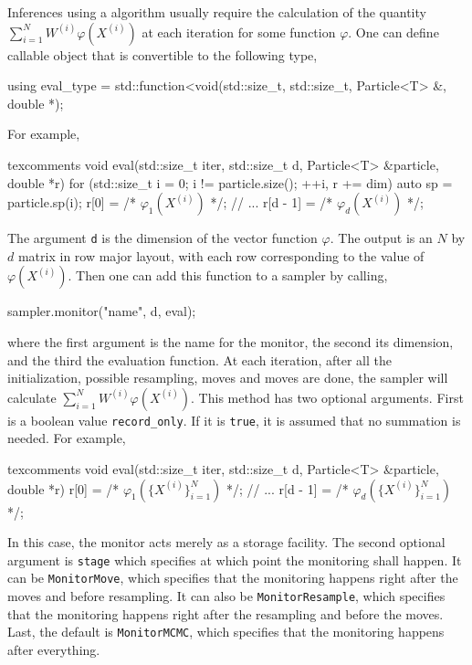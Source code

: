 Inferences using a \smc algorithm usually require the calculation of the
quantity $\sum_{i=1}^NW^{(i)}\varphi(X^{(i)})$ at each iteration for some
function $\varphi$. One can define callable object that is convertible to the
following type,
\begin{cppcode}
  using eval_type =
      std::function<void(std::size_t, std::size_t, Particle<T> &, double *);
\end{cppcode}
For example,
\begin{cppcode*}{texcomments}
  void eval(std::size_t iter, std::size_t d, Particle<T> &particle, double *r)
  {
      for (std::size_t i = 0; i != particle.size(); ++i, r += dim) {
          auto sp = particle.sp(i);
          r[0] = /* $\varphi_1(X^{(i)})$ */;
          // ...
          r[d - 1] = /* $\varphi_d(X^{(i)})$ */;
      }
  }
\end{cppcode*}
The argument \verb|d| is the dimension of the vector function $\varphi$. The
output is an $N$ by $d$ matrix in row major layout, with each row corresponding
to the value of $\varphi(X^{(i)})$. Then one can add this function to a sampler
by calling,
\begin{cppcode}
  sampler.monitor("name", d, eval);
\end{cppcode}
where the first argument is the name for the monitor, the second its dimension,
and the third the evaluation function. At each iteration, after all the
initialization, possible resampling, moves and \mcmc moves are done, the
sampler will calculate $\sum_{i=1}^NW^{(i)}\varphi(X^{(i)})$. This method has
two optional arguments. First is a boolean value \verb|record_only|. If it is
\verb|true|, it is assumed that no summation is needed. For example,
\begin{cppcode*}{texcomments}
  void eval(std::size_t iter, std::size_t d, Particle<T> &particle, double *r)
  {
      r[0] = /* $\varphi_1(\{X^{(i)}\}_{i=1}^N)$ */;
      // ...
      r[d - 1] = /* $\varphi_d(\{X^{(i)}\}_{i=1}^N)$ */;
  }
\end{cppcode*}
In this case, the monitor acts merely as a storage facility. The second
optional argument is \verb|stage| which specifies at which point the monitoring
shall happen. It can be \verb|MonitorMove|, which specifies that the monitoring
happens right after the moves and before resampling. It can also be
\verb|MonitorResample|, which specifies that the monitoring happens right after
the resampling and before the \mcmc moves. Last, the default is
\verb|MonitorMCMC|, which specifies that the monitoring happens after
everything.

